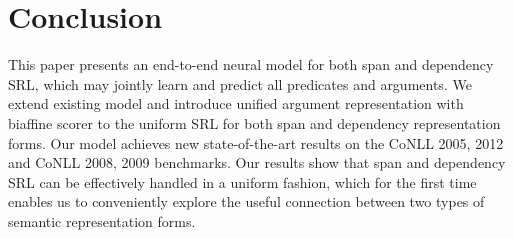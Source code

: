 \documentclass[letterpaper]{article} %
\begin{document}


\section{Conclusion}
This paper presents an end-to-end neural model for both span and dependency SRL, which may jointly learn and predict all predicates and arguments. We extend existing model and introduce unified argument representation with biaffine scorer to the uniform SRL for both span and dependency representation forms. Our model achieves new state-of-the-art results on the CoNLL 2005, 2012 and CoNLL 2008, 2009 benchmarks. Our results show that span and dependency SRL can be effectively handled in a uniform fashion, which for the first time enables us to conveniently explore the useful connection between two types of semantic representation forms. 


%
%
%		
%		
\end{document}
